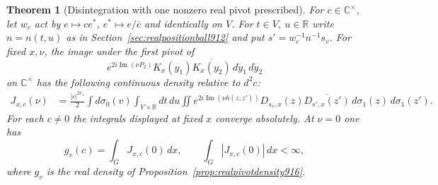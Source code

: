 \documentclass[a4paper,11pt]{article}
\newtheorem{theorem}[proposition]{Theorem}
\theoremstyle{definition}
\theoremstyle{remark}
\numberwithin{equation}{section}
\begin{document}
\begin{theorem}[Disintegration with one nonzero real pivot prescribed]
\leavevmode\label{thm:conditionedpivot917}
For \(c\in\mathbb C^\times\), let \(w_c\) act by
\(e\mapsto c e^*\), \(e^*\mapsto e/\bar c\) and identically
on \(V\). For \(t\in V,\ u\in\mathbb R\) write \(n=n(t,u)\)
as in Section~\ref{sec:realpositionball912} and put
\(s'=w_c^{-1}n^{-1}s_v\).
For fixed \(x,\nu\), the image under the first pivot of
\[
  e^{2i\operatorname{Im}(\nu P_2)}
     K_x(y_1)\overline{K_x(y_2)}\,
                        d\dot y_1\,d\dot y_2
\]
on \(\mathbb C^\times\) has the following continuous density
relative to \(d^2c\):
\begin{align}
 J_{x,c}(\nu)
 &=\frac{|c|^{2r_1}}{2}\int d\sigma_0(v)
    \int_{V\times\mathbb R}dt\,du
    \iint e^{2i\operatorname{Im}(\nu h(z,z'))}
       D_{s_v,x}(z)\overline{D_{s',x}(z')}
                              \,d\sigma_1(z)\,d\sigma_1(z').
 \label{eq:conditionedpivot917}
\end{align}
For each \(c\ne0\) the integrals displayed at fixed \(x\)
converge absolutely. At \(\nu=0\) one has
\begin{equation}
       g_v(c)=\int_G J_{x,c}(0)\,dx,\qquad
                   \int_G|J_{x,c}(0)|\,dx<\infty ,
 \label{eq:conditionedzero917}
\end{equation}
where \(g_v\) is the real density of
Proposition~\ref{prop:realpivotdensity916}.
\end{theorem}
\end{document}
